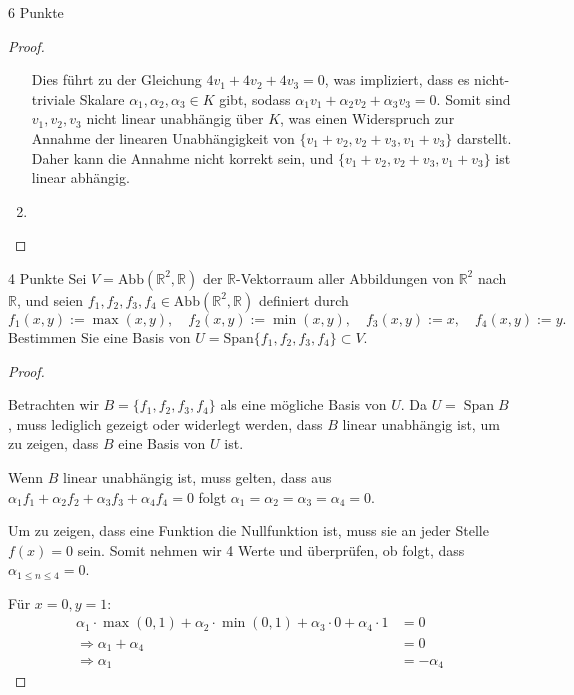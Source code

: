 \documentclass{../problemset}
\begin{document}
\begin{problem}{6 Punkte}
\begin{proof}
\begin{enumerate}
		      Dies führt zu der Gleichung $4v_1 + 4v_2 + 4v_3 = 0$, was impliziert, dass es nicht-triviale Skalare $\alpha_1, \alpha_2, \alpha_3 \in K$ gibt, sodass $\alpha_1 v_1 + \alpha_2 v_2 + \alpha_3 v_3 = 0$.
		      Somit sind $v_1, v_2, v_3$ nicht linear unabhängig über $K$, was einen Widerspruch zur Annahme der linearen Unabhängigkeit von $\{v_1+v_2, v_2+v_3, v_1+v_3\}$ darstellt.
		      Daher kann die Annahme nicht korrekt sein, und $\{v_1+v_2, v_2+v_3, v_1+v_3\}$ ist linear abhängig.

		\item
	\end{enumerate}
\end{proof}
\end{problem}

\begin{problem}{4 Punkte}
Sei $V = \text{Abb}(\mathbb{R}^2, \mathbb{R})$ der $\mathbb{R}$-Vektorraum aller Abbildungen von $\mathbb{R}^2$ nach $\mathbb{R}$, und seien $f_1, f_2, f_3, f_4 \in \text{Abb}(\mathbb{R}^2, \mathbb{R})$ definiert durch
\[ f_1(x, y) := \max(x, y), \quad f_2(x, y) := \min(x, y), \quad f_3(x, y) := x, \quad f_4(x, y) := y. \]
Bestimmen Sie eine Basis von $U = \text{Span}\{f_1, f_2, f_3, f_4\} \subset V$.
\begin{proof}
	$ $

	Betrachten wir $B = \{f_1, f_2, f_3, f_4\}$ als eine mögliche Basis von $U$.
	Da $U = \operatorname{Span} B$, muss lediglich gezeigt oder widerlegt werden, dass $B$ linear unabhängig ist, um zu zeigen, dass $B$ eine Basis von $U$ ist.

	Wenn $B$ linear unabhängig ist, muss gelten, dass aus $\alpha_1 f_1 + \alpha_2 f_2 + \alpha_3 f_3 + \alpha_4 f_4 = 0$ folgt $\alpha_1 = \alpha_2 = \alpha_3 = \alpha_4 = 0$.

	Um zu zeigen, dass eine Funktion die Nullfunktion ist, muss sie an jeder Stelle $f(x) = 0$ sein.
	Somit nehmen wir 4 Werte und überprüfen, ob folgt, dass $\alpha_{1 \le n \le 4} = 0$.

	Für $x = 0, y = 1$:
	\begin{align*}
		\alpha_1 \cdot \max(0, 1) + \alpha_2 \cdot \min(0, 1) + \alpha_3 \cdot 0 + \alpha_4 \cdot 1 & = 0         \\
		\Rightarrow \alpha_1 + \alpha_4                                                             & = 0         \\
		\Rightarrow \alpha_1                                                                        & = -\alpha_4
	\end{align*}


\end{proof}
\end{problem}
\end{document}
